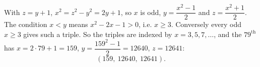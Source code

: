 With $z=y+1$, $x^2=z^2-y^2=2y+1$, so $x$ is odd, $y=\dfrac{x^2-1}{2}$ and $z=\dfrac{x^2+1}{2}$. The condition $x<y$ means $x^2-2x-1>0$, i.e. $x\ge3$. Conversely every odd $x\ge3$ gives such a triple. So the triples are indexed by $x=3,5,7,\dots$, and the $79^{\text{th}}$ has $x=2\cdot79+1=159$, $y=\dfrac{159^2-1}{2}=12640$, $z=12641$:
\[\boxed{(159,\ 12640,\ 12641)}.\]

